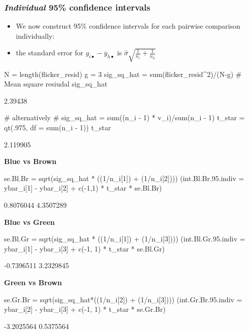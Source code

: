 \documentclass[a4paper]{article}\usepackage[]{graphicx}\usepackage[]{xcolor}
\begin{document}
\subsubsection{\textit{Individual} 95\% confidence intervals}
\begin{itemize}
	\item We now construct 95\% confidence intervals for each pairwise comparison individually:
	\item the standard error for \( y_{i\bullet} - \overline{y}_{h\bullet} \) is \( \hat{\sigma} \sqrt{\frac{1}{n_i} + \frac{1}{n_h}} \)  
\end{itemize}
\begin{Schunk}
\begin{Sinput}
N = length(flicker_resid)
g = 3
sig_sq_hat = sum(flicker_resid^2)/(N-g) # Mean square resiudal
sig_sq_hat
\end{Sinput}
\begin{Soutput}
[1] 2.39438
\end{Soutput}
\begin{Sinput}
# alternatively
# sig_sq_hat = sum((n_i - 1) * v_i)/sum(n_i - 1)
t_star = qt(.975, df = sum(n_i - 1))
t_star
\end{Sinput}
\begin{Soutput}
[1] 2.119905
\end{Soutput}
\end{Schunk}
\textbf{Blue vs Brown}
\begin{Schunk}
\begin{Sinput}
se.Bl.Br = sqrt(sig_sq_hat * ((1/n_i[1]) + (1/n_i[2])))
(int.Bl.Br.95.indiv = ybar_i[1] - ybar_i[2] + c(-1,1) * t_star * se.Bl.Br)
\end{Sinput}
\begin{Soutput}
[1] 0.8076044 4.3507289
\end{Soutput}
\end{Schunk}
\textbf{Blue vs Green}
\begin{Schunk}
\begin{Sinput}
se.Bl.Gr = sqrt(sig_sq_hat * ((1/n_i[1]) + (1/n_i[3])))
(int.Bl.Gr.95.indiv = ybar_i[1] - ybar_i[3] + c(-1, 1) * t_star * se.Bl.Gr)
\end{Sinput}
\begin{Soutput}
[1] -0.7396511  3.2329845
\end{Soutput}
\end{Schunk}
\textbf{Green vs Brown}
\begin{Schunk}
\begin{Sinput}
se.Gr.Br = sqrt(sig_sq_hat*((1/n_i[2]) + (1/n_i[3])))
(int.Gr.Br.95.indiv = ybar_i[2] - ybar_i[3] + c(-1, 1) * t_star * se.Gr.Br)
\end{Sinput}
\begin{Soutput}
[1] -3.2025564  0.5375564
\end{Soutput}
\end{Schunk}
\end{document}
